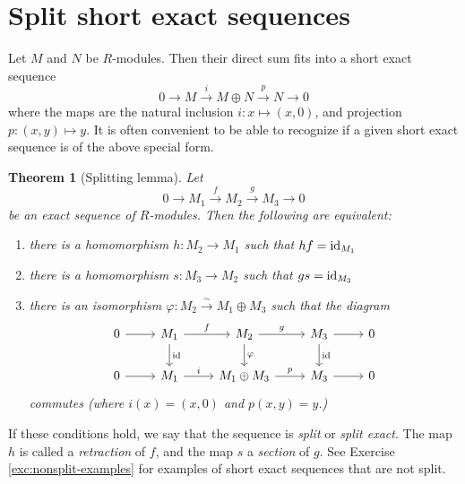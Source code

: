 \documentclass[11pt]{amsbook}
\newcommand{\isomto}{\overset{\sim}{\to}}
\newcommand{\longto}{\longrightarrow}
\def\id{{\rm id}}
\theoremstyle{plain}
\newtheorem{theorem}{Theorem}
\theoremstyle{definition}
\begin{document}
\section{Split short exact sequences}

Let $M$ and $N$ be $R$-modules. Then their direct sum fits into a short exact sequence
\[
	0 \longto M \overset{i}{\longto} M\oplus N \overset{p}{\longto} N \longto 0
\]
where the maps are the natural inclusion $i\colon x\mapsto (x,0)$, and projection $p\colon (x,y)\mapsto y$. It is often convenient to be able to recognize if a given short exact sequence is of the above special form.

\begin{theorem}[Splitting lemma]\label{thm:splitting-lemma}
Let
\[
	0 \longto M_1 \overset{f}{\longto} M_2 \overset{g}{\longto} M_3 \longto 0
\]
be an exact sequence of $R$-modules. Then the following are equivalent:
\begin{enumerate}
\item there is a homomorphism $h\colon M_2 \to M_1$ such that $hf=\id_{M_1}$
\item there is a homomorphism $s\colon M_3 \to M_2$ such that $gs=\id_{M_3}$
\item there is an isomorphism $\varphi\colon M_2 \isomto M_1 \oplus M_3$ such that the diagram
\[
\begin{tikzcd}
0 \arrow{r} & M_1 \arrow{r}{f} \arrow{d}{\id} 
	& M_2 \arrow{r}{g} \arrow{d}{\varphi} 
	& M_3 \arrow{r} \arrow{d}{\id} & 0 \\
0 \arrow{r} & M_1 \arrow{r}{i} & M_1 \oplus M_3 \arrow{r}{p} & M_3 \arrow{r} & 0
\end{tikzcd}
\]
commutes (where $i(x)=(x,0)$ and $p(x,y)=y$.)
\end{enumerate}
\end{theorem}

If these conditions hold, we say that the sequence is \emph{split} or \emph{split exact}. The map $h$ is called a \emph{retraction} of $f$, and the map $s$ a \emph{section} of $g$. See Exercise \ref{exc:nonsplit-examples} for examples of short exact sequences that are not split.
\end{document}
